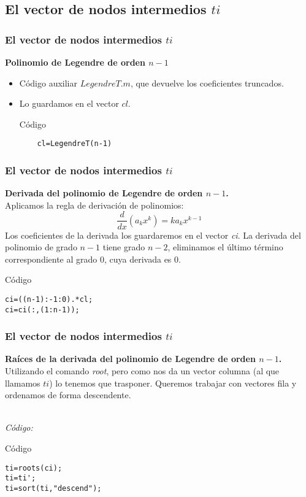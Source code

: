 \documentclass{beamer}
\begin{document}
\subsection{El vector de nodos intermedios $ti$}
\begin{frame}[fragile]
\frametitle{El vector de nodos intermedios $ti$}

\textbf{Polinomio de Legendre de orden $n-1$}
\begin{itemize}
    \item Código auxiliar $LegendreT.m$, que devuelve los coeficientes truncados.
    \item Lo guardamos en el vector $cl$. \\
    \begin{exampleblock}{Código}
    \begin{verbatim}
    cl=LegendreT(n-1)
    \end{verbatim}
    \end{exampleblock}
     
   
    
\end{itemize}



\end{frame}
\begin{frame}[fragile]
\frametitle{El vector de nodos intermedios $ti$}



\textbf{Derivada del polinomio de Legendre de orden $n-1$.}
\\ Aplicamos la regla de derivación de polinomios:
\[
\frac{d}{dx}(a_k x^k)=k a_k x^{k-1}
\]
Los coeficientes de la derivada los guardaremos en el vector \textit{ci}.
La derivada del polinomio de grado $n-1$ tiene grado $n-2$, eliminamos el último término correspondiente al grado 0, cuya derivada es 0. \\ 
\begin{exampleblock}{Código}
\begin{verbatim}
ci=((n-1):-1:0).*cl; 
ci=ci(:,(1:n-1));
\end{verbatim}
\end{exampleblock}


\end{frame}
\begin{frame}[fragile]
\frametitle{El vector de nodos intermedios $ti$}

\textbf{Raíces de la derivada del polinomio de Legendre de orden $n-1$.}
Utilizando el comando \textit{root}, pero como nos da un vector columna (al que llamamos $ti$) lo tenemos que trasponer. Queremos trabajar con vectores fila y ordenamos de forma descendente.

\textit{\\Código:}
\begin{exampleblock}{Código}
\begin{verbatim}
ti=roots(ci);
ti=ti';
ti=sort(ti,"descend");
\end{verbatim}
\end{exampleblock}
\end{frame}
\end{document}
